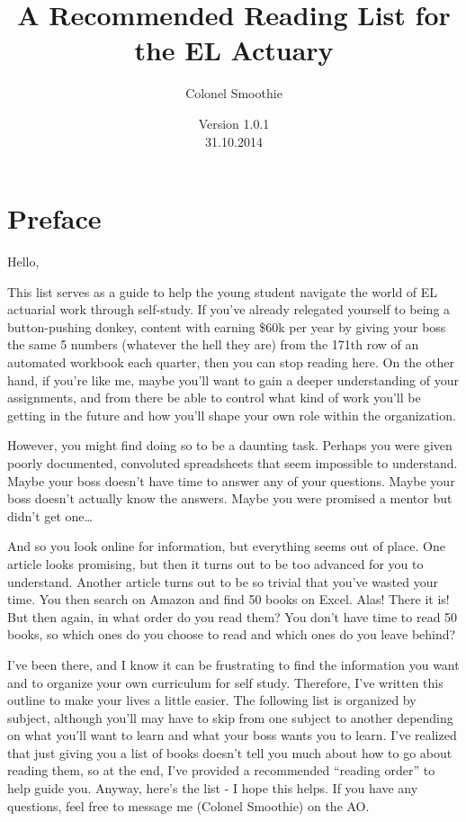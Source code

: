 \documentclass[oneside, titlepage]{article}
\begin{document}
\title{A Recommended Reading List for the EL Actuary}
\author{Colonel Smoothie}
\date{ Version 1.0.1\\ 31.10.2014}
\maketitle

\section*{Preface}

Hello,

This list serves as a guide to help the young student navigate the world of EL actuarial work through self-study. If you've already relegated yourself to being a button-pushing donkey, content with earning \$60k per year by giving your boss the same 5 numbers (whatever the hell they are) from the 171th row of an automated workbook each quarter, then you can stop reading here. On the other hand, if you're like me, maybe you'll want to gain a deeper understanding of your assignments, and from there be able to control what kind of work you'll be getting in the future and how you'll shape your own role within the organization.

However, you might find doing so to be a daunting task. Perhaps you were given poorly documented, convoluted spreadsheets that seem impossible to understand. Maybe your boss doesn't have time to answer any of your questions. Maybe your boss doesn't actually know the answers. Maybe you were promised a mentor but didn't get one\ldots

And so you look online for information, but everything seems out of place. One article looks promising, but then it turns out to be too advanced for you to understand. Another article turns out to be so trivial that you've wasted your time. You then search on Amazon and find 50 books on Excel. Alas! There it is! But then again, in what order do you read them? You don't have time to read 50 books, so which ones do you choose to read and which ones do you leave behind?

I've been there, and I know it can be frustrating to find the information you want and to organize your own curriculum for self study. Therefore, I've written this outline to make your lives a little easier. The following list is organized by subject, although you'll may have to skip from one subject to another depending on what you'll want to learn and what your boss wants you to learn. I've realized that just giving you a list of books doesn't tell you much about how to go about reading them, so at the end, I've provided a recommended ``reading order'' to help guide you. Anyway, here's the list - I hope this helps. If you have any questions, feel free to message me (Colonel Smoothie) on the AO.
\end{document}
